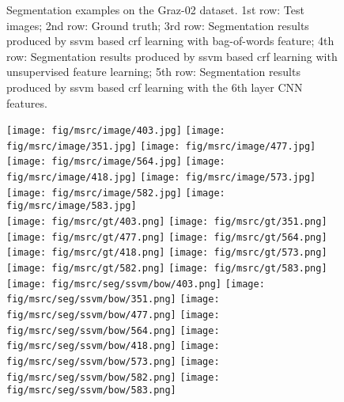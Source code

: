 \documentclass[10pt,3p]{elsarticle}
\newcommand{\ssvm}{{\sc ssvm}\xspace}
\newcommand{\crf}{{\sc crf}\xspace}
\begin{document}
\begin{figure}[t]
\caption{Segmentation examples on the Graz-02 dataset. 1st row: Test images; 2nd row: Ground truth; 
3rd row: Segmentation results produced by \ssvm based  \crf learning with bag-of-words feature;
4th row: Segmentation results produced by \ssvm based  \crf learning with unsupervised feature learning; 
5th row: Segmentation results produced by \ssvm based  \crf learning with the 6th layer CNN features. }
\label{fig:seg_graz02}     
\end{figure}\begin{figure}[!t]
\centering
	\texttt{[image: fig/msrc/image/403.jpg]}
     \texttt{[image: fig/msrc/image/351.jpg]}     
	\texttt{[image: fig/msrc/image/477.jpg]}
    \texttt{[image: fig/msrc/image/564.jpg]}
     \texttt{[image: fig/msrc/image/418.jpg]}
     \texttt{[image: fig/msrc/image/573.jpg]}   
     \texttt{[image: fig/msrc/image/582.jpg]} 
     \texttt{[image: fig/msrc/image/583.jpg]}\\
     
	\texttt{[image: fig/msrc/gt/403.png]}
     \texttt{[image: fig/msrc/gt/351.png]}     
	\texttt{[image: fig/msrc/gt/477.png]}
	\texttt{[image: fig/msrc/gt/564.png]}
     \texttt{[image: fig/msrc/gt/418.png]}
     \texttt{[image: fig/msrc/gt/573.png]}   
     \texttt{[image: fig/msrc/gt/582.png]} 
     \texttt{[image: fig/msrc/gt/583.png]}\\
     
     
	\texttt{[image: fig/msrc/seg/ssvm/bow/403.png]}
     \texttt{[image: fig/msrc/seg/ssvm/bow/351.png]}     
	\texttt{[image: fig/msrc/seg/ssvm/bow/477.png]}
    \texttt{[image: fig/msrc/seg/ssvm/bow/564.png]}
     \texttt{[image: fig/msrc/seg/ssvm/bow/418.png]}
     \texttt{[image: fig/msrc/seg/ssvm/bow/573.png]}   
     \texttt{[image: fig/msrc/seg/ssvm/bow/582.png]} 
     \texttt{[image: fig/msrc/seg/ssvm/bow/583.png]}\\
     

\end{figure}
\end{document}
